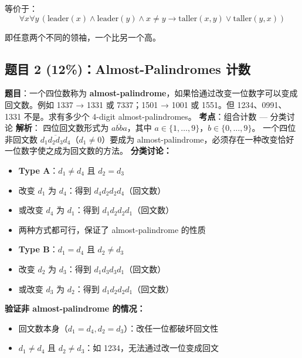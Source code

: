 \documentclass[10pt,a4paper,openany]{ctexbook}
\theoremstyle{definition}
\theoremstyle{remark}
\begin{document}
等价于：
\[
 \forall x \forall y \, (\text{leader}(x) \land \text{leader}(y) \land x \neq y \to \text{taller}(x, y) \lor \text{taller}(y, x)) 
\]

即任意两个不同的领袖，一个比另一个高。
\vspace{-2pt}

\subsection{题目 2 (12\%)：Almost-Palindromes 计数}

\textbf{题目}：一个四位数称为 \textbf{almost-palindrome}，如果恰通过改变一位数字可以变成回文数。例如 1337 → 1331 或 7337；1501 → 1001 或 1551。但 1234、0991、1331 不是。求有多少个 4-digit almost-palindromes。
\textbf{考点}：组合计数 — 分类讨论
\textbf{解析}：
四位回文数形式为 $\overline{abba}$，其中 $a \in \{1,\dots,9\}$，$b \in \{0,\dots,9\}$。
一个四位非回文数 $\overline{d_1d_2d_3d_4}$（$d_1 \neq 0$）要成为 almost-palindrome，必须存在一种改变恰好一位数字使之成为回文数的方法。
\textbf{分类讨论：}
\begin{itemize}
\item \textbf{Type A}：$d_1 \neq d_4$ 且 $d_2 = d_3$
\item 改变 $d_1$ 为 $d_4$：得到 $d_4 d_2 d_2 d_4$（回文数）
\item 或改变 $d_4$ 为 $d_1$：得到 $d_1 d_2 d_2 d_1$（回文数）
\item 两种方式都可行，保证了 almost-palindrome 的性质

\item \textbf{Type B}：$d_1 = d_4$ 且 $d_2 \neq d_3$
\item 改变 $d_2$ 为 $d_3$：得到 $d_1 d_3 d_3 d_1$（回文数）
\item 或改变 $d_3$ 为 $d_2$：得到 $d_1 d_2 d_2 d_1$（回文数）

\end{itemize}

\textbf{验证非 almost-palindrome 的情况：}
\begin{itemize}
\item 回文数本身（$d_1 = d_4, d_2 = d_3$）：改任一位都破坏回文性
\item $d_1 \neq d_4$ 且 $d_2 \neq d_3$：如 1234，无法通过改一位变成回文

\end{itemize}
\end{document}
